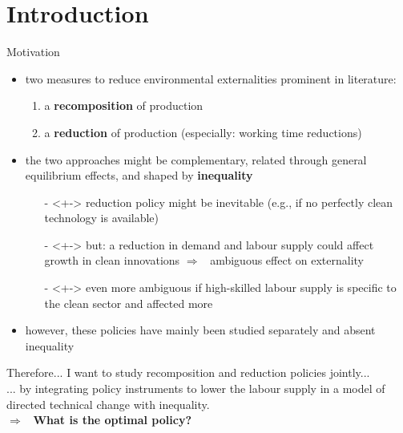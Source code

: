 \documentclass[11pt,aspectratio=169]{beamer}
\newcommand{\ar}{$\Rightarrow$ \ }
\begin{document}
\section{Introduction}
\begin{frame}{Motivation}

\begin{itemize}
\item<+-> two measures to reduce environmental externalities prominent in literature: 
\begin{enumerate}
\item a \alert{\textbf{recomposition}} of production
\item a \textbf{\alert{reduction}} of production (especially: working time reductions)
\end{enumerate}
\vspace{3mm} 
\item<+-> the two approaches might be complementary, related through general equilibrium effects, and shaped by \textbf{\alert{inequality}}
\vspace{3mm}
\begin{itemize}
\item[-]<+-> reduction policy might be inevitable (e.g., if no perfectly clean technology is available)
\item[-]<+-> but: a reduction in demand and labour supply could affect growth in clean innovations \ar ambiguous effect on externality
\item[-]<+-> even more ambiguous if high-skilled labour supply is specific to the clean sector and affected more
\end{itemize}
\vspace{3mm}
\item<+-> however,  these policies have mainly been studied separately and absent inequality
\end{itemize}
\end{frame}

\begin{frame}
	\begin{block}{Therefore...}
I want to study recomposition and reduction policies jointly... 
\\
\pause
... by integrating policy instruments to lower the labour supply in a model of directed technical change with  inequality. \\
\vspace{2mm}
\pause
\ar \textbf{What is the optimal policy?}
	\end{block}

\end{frame}
\end{document}
